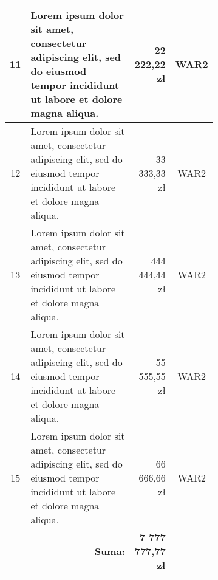 \begin{longtable}{| c | m{0.58\linewidth} | r | m{0.1\linewidth} |}
    11 & Lorem ipsum dolor sit amet, consectetur adipiscing elit, sed do eiusmod tempor incididunt ut labore et dolore magna aliqua. & 22 222,22 zł & \multicolumn{1}{c|}{WAR2} \\ \hline
    12 & Lorem ipsum dolor sit amet, consectetur adipiscing elit, sed do eiusmod tempor incididunt ut labore et dolore magna aliqua. & 33 333,33 zł & \multicolumn{1}{c|}{WAR2} \\ \hline
    13 & Lorem ipsum dolor sit amet, consectetur adipiscing elit, sed do eiusmod tempor incididunt ut labore et dolore magna aliqua. & 444 444,44 zł & \multicolumn{1}{c|}{WAR2} \\ \hline
    14 & Lorem ipsum dolor sit amet, consectetur adipiscing elit, sed do eiusmod tempor incididunt ut labore et dolore magna aliqua. & 55 555,55 zł & \multicolumn{1}{c|}{WAR2} \\ \hline
    15 & Lorem ipsum dolor sit amet, consectetur adipiscing elit, sed do eiusmod tempor incididunt ut labore et dolore magna aliqua. & 66 666,66 zł & \multicolumn{1}{c|}{WAR2} \\ \hline
    & \multicolumn{1}{r|}{\textbf{Suma:}} & \textbf{7 777 777,77 zł} & 
    \label{table:koszty}
\end{longtable}
\kant[4]

